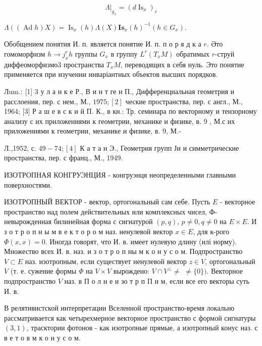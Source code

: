 \documentclass[10pt]{article}
\begin{document}
\[

\left.\Lambda\right|_{g_{x}}=\left(d \operatorname{Is}_{x}\right)_{e}

\]



$\Lambda((\operatorname{Ad} h) X)=\operatorname{Is}_{x}(h) \Lambda(X) \mathbf{I s}_{x}(h)^{-1}\left(h \in G_{x}\right)$.



Обобщением понятия И. п. является понятие И. п. п о р я д к а $r$. Әто гомоморфизм $h \rightarrow j_{x}^{r} h$ группы $G_{x}$ в группу $L^{r}\left(T_{x} M\right)$ обратимых $r$-струй диффеоморфизмо3 пространства $T_{x} M$, переводящих в себя нуль. Это понятие применяется при изучении инваріантных объектов высших порядков.



Лum.: [1] 3 у л а н к е Р., В и н т ге н П., Дифференциальная геометрия и расслоения, пер. с нем., М., $1975 ;[2]$ ческие пространства, пер. с англ., М., 1964; [3] Р а ш е в с к и й П. К., в кн.: Тр. семинара по векторному и тензорному анализу с их приложениями к геометрии, механике и физике, в. 9 , М.с их приложениями к геометрии, механике и физике, в. 9, М.-

Л.,1952, с. $49-74 ;[4]$ К а т а н Э., Геометрия групп Ји и симметрические пространства, пер. с франц., М., 1949.



ИЗОТРОПНАЯ КОНГРУЭНЦИЯ - конгруэнця неопределенными главными поверхностями.



ИЗОТРОПНЫЙ ВЕКТОР - вектор, ортогональный сам себе. Пусть $E$ - векторное пространство над полем действительных или комплексных чисел, Ф- невырожденная билинейная форма с сигнатурой $(p, q)$, $p \neq 0, q \neq 0$ на $E \times E$. И з о т р о п н ы м в е к т о р о м наз. ненулевой вектор $x \in E$, для к-рого $\Phi(x, x)=0$. Иногда говорят, что И. в. имеет нулевую длину (илі норму). Множество всех И. в. наз. и з о т р о п ны м к о н у с о м. Подпространство $V \subset E$ наз. изотропным, если существует ненулевой вектор $z \in V$, ортогональный $V$ (т. е. сужение формы $\Phi$ на $V \times V$ вырождено: $V \cap V^{\perp} \neq$ $\neq\{0\})$. Векторное подпространство $V$ наз. в П о л н е и зо т р п П н м, если все его векторы суть И. в.



В релятивистской интерпретации Вселенной пространство-время локально рассматривается как четырехмерное векторное пространство с формой сигнатуры $(3,1)$, трасктории фотонов - как изотропные прямые, а изотропный конус наз. с в е т о в м к о н у с о м.
\end{document}
